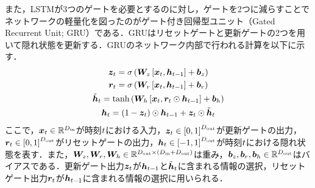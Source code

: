 また，LSTMが3つのゲートを必要とするのに対し，ゲートを2つに減らすことでネットワークの軽量化を図ったのがゲート付き回帰型ユニット（Gated Recurrent Unit; GRU）\cite{cho2014learning}である．GRUはリセットゲートと更新ゲートの2つを用いて隠れ状態を更新する．GRUのネットワーク内部で行われる計算を以下に示す．
\begin{gather}
    \bm{z}_{t} = \sigma\left(\bm{W}_{z}\left[\bm{x}_{t}, \bm{h}_{t-1}\right] + \bm{b}_{z}\right) \\
    \bm{r}_{t} = \sigma\left(\bm{W}_{r}\left[\bm{x}_{t}, \bm{h}_{t-1}\right] + \bm{b}_{r}\right) \\
    \tilde{\bm{h}}_{t} = \tanh\left(\bm{W}_{h}\left[\bm{x}_{t}, \bm{r}_{t} \odot \bm{h}_{t-1}\right] + \bm{b}_{h}\right) \\
    \bm{h}_{t} = \left(1 - \bm{z}_{t}\right) \odot \bm{h}_{t-1} + \bm{z}_{t} \odot \tilde{\bm{h}}_{t}
\end{gather}
ここで，$\bm{x}_{t} \in \mathbb{R}^{D_{\text{in}}}$が時刻$t$における入力，$\bm{z}_{t} \in \left[0, 1\right]^{D_{\text{out}}}$が更新ゲートの出力，$\bm{r}_{t} \in \left[0, 1\right]^{D_{\text{out}}}$がリセットゲートの出力，$\bm{h}_{t} \in \left[-1, 1\right]^{D_{\text{out}}}$が時刻$t$における隠れ状態を表す．また，$\bm{W}_{z}, \bm{W}_{r}, \bm{W}_{h} \in \mathbb{R}^{D_{\text{out}} \times \left(D_{\text{in}} + D_{\text{out}}\right)}$は重み，$\bm{b}_{z}, \bm{b}_{r}, \bm{b}_{h} \in \mathbb{R}^{D_{\text{out}}}$はバイアスである．更新ゲート出力$\bm{z}_{t}$が$\bm{h}_{t - 1}$と$\tilde{\bm{h}}_{t}$に含まれる情報の選択，リセットゲート出力$\bm{r}_{t}$が$\bm{h}_{t - 1}$に含まれる情報の選択に用いられる．

